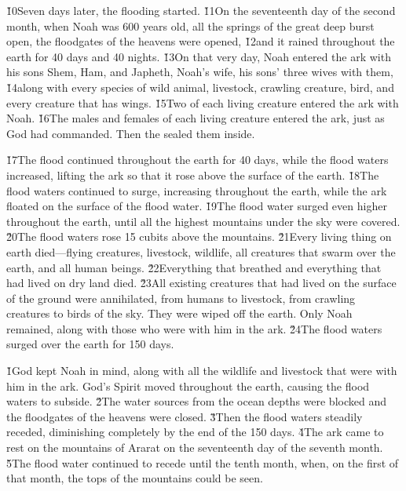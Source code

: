 \v{10}Seven days later, the flooding started. \v{11}On the seventeenth day of the second month, when Noah was 600 years old, all the springs of the great deep burst open, the floodgates of the heavens were opened, \v{12}and it rained throughout the earth for 40 days and 40 nights. \v{13}On that very day, Noah entered the ark with his sons Shem, Ham, and Japheth, Noah's wife, his sons' three wives with them, \v{14}along with every species of wild animal, livestock, crawling creature, bird, and every creature that has wings. \v{15}Two of each living creature entered the ark with Noah. \v{16}The males and females of each living creature entered the ark, just as God had commanded. Then the  sealed them inside.

\v{17}The flood continued throughout the earth for 40 days, while the flood waters increased, lifting the ark so that it rose above the surface of the earth. \v{18}The flood waters continued to surge, increasing throughout the earth, while the ark floated on the surface of the flood water. \v{19}The flood water surged even higher throughout the earth, until all the highest mountains under the sky were covered. \v{20}The flood waters rose 15 cubits above the mountains. \v{21}Every living thing on earth died---flying creatures, livestock, wildlife, all creatures that swarm over the earth, and all human beings. \v{22}Everything that breathed and everything that had lived on dry land died. \v{23}All existing creatures that had lived on the surface of the ground were annihilated, from humans to livestock, from crawling creatures to birds of the sky. They were wiped off the earth. Only Noah remained, along with those who were with him in the ark. \v{24}The flood waters surged over the earth for 150 days.

\v{1}God kept Noah in mind, along with all the wildlife and livestock that were with him in the ark. God's Spirit moved throughout the earth, causing the flood waters to subside. \v{2}The water sources from the ocean depths were blocked and the floodgates of the heavens were closed. \v{3}Then the flood waters steadily receded, diminishing completely by the end of the 150 days. \v{4}The ark came to rest on the mountains of Ararat on the seventeenth day of the seventh month. \v{5}The flood water continued to recede until the tenth month, when, on the first of that month, the tops of the mountains could be seen.

